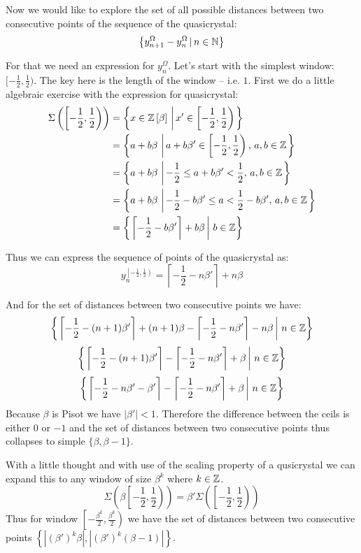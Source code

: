 \documentclass[text.tex]{subfiles}
\begin{document}
Now we would like to explore the set of all possible distances between two consecutive points of the sequence of the quasicrystal: 
$$\left\{ y^\Omega_{n+1}-y^\Omega_{n}\,|\, n\in\mathbb{N} \right\}$$

For that we need an expression for $y^\Omega_n$. Let's start with the simplest window: $[-\frac{1}{2}, \frac{1}{2})$. The key here is the length of the window -- i.e. $1$. First we do a little algebraic exercise with the expression for quasicrystal:
\begin{align*}
\Sigma\left(\left[-\frac{1}{2}, \frac{1}{2}\right)\right) &= \left\{x\in\ring\,\left|\, x'\in \left[-\frac{1}{2}, \frac{1}{2}\right)\right.\right\}\\%
 &= \left\{a+b\beta\,\left|\, a+b\beta'\in \left[-\frac{1}{2}, \frac{1}{2}\right),\,a,b\in\ZZ\right.\right\}\\%
  &= \left\{a+b\beta\,\left|\, -\frac{1}{2}\leq a+b\beta'<\frac{1}{2},\,a,b\in\ZZ\right.\right\}\\
  &= \left\{a+b\beta\,\left|\, -\frac{1}{2}-b\beta'\leq a < \frac{1}{2}-b\beta',\,a,b\in\ZZ\right.\right\}\\
  &= \left\{\left.\left\lceil-\frac{1}{2} -b\beta'\right\rceil + b\beta\,\right|\, b\in\ZZ\right\}\\
\end{align*}


Thus we can express the sequence of points of the quasicrystal as:
$$y^{\left[-\frac{1}{2}, \frac{1}{2}\right)}_n = \left\lceil-\frac{1}{2} -n\beta'\right\rceil + n\beta$$%

And for the set of distances between two consecutive points we have:
$$\left\{ \left.\left\lceil-\frac{1}{2} -(n+1)\beta'\right\rceil + (n+1)\beta - \left\lceil-\frac{1}{2} -n\beta'\right\rceil - n\beta \,\right|\, n\in\mathbb{Z}\right\}$$%
$$\left\{ \left.\left\lceil-\frac{1}{2} -(n+1)\beta'\right\rceil - \left\lceil-\frac{1}{2} -n\beta'\right\rceil + \beta \,\right|\, n\in\mathbb{Z}\right\}$$%
$$\left\{ \left.\left\lceil-\frac{1}{2} -n\beta' - \beta'\right\rceil - \left\lceil-\frac{1}{2} -n\beta'\right\rceil + \beta \,\right|\, n\in\mathbb{Z}\right\}$$%
Because $\beta$ is Pisot we have $|\beta'|<1$. Therefore the difference between the ceils is either $0$ or $-1$ and the set of distances between two consecutive points thus collapses to simple $\{\beta, \beta - 1\}$. 

With a little thought and with use of the scaling property of a qusicrystal we can expand this to any window of size $\beta^k$ where $k\in\mathbb{Z}$. 
$$\Sigma\left(\beta\left[-\frac{1}{2}, \frac{1}{2}\right)\right) = \beta'\Sigma\left(\left[-\frac{1}{2}, \frac{1}{2}\right)\right)$$%
Thus for window $\left[-\frac{\beta^k}{2}, \frac{\beta^k}{2}\right)$ we have the set of distances between two consecutive points $\left\{\left|(\beta')^k\beta\right|, \left|(\beta')^k(\beta - 1)\right|\right\}$. %
\end{document}
